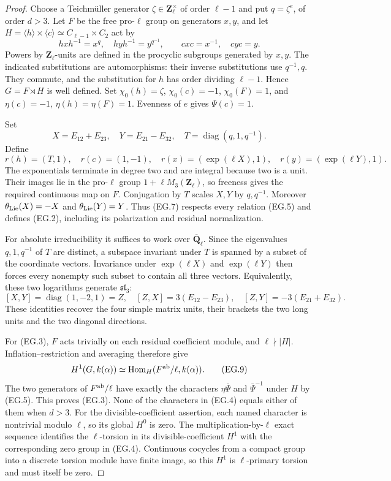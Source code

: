 \documentclass[11pt,a4paper]{article}
\theoremstyle{definition}
\begin{document}
\begin{proof}
Choose a Teichm\"uller generator
$\zeta\in\mathbf Z_\ell^\times$ of order $\ell-1$
and put $q=\zeta^e$, of order $d>3$.
Let $F$ be the free pro-$\ell$ group on generators
$x,y$, and let
$H=\langle h\rangle\times\langle c\rangle
\simeq C_{\ell-1}\times C_2$ act by
\[
 hxh^{-1}=x^q,\quad hyh^{-1}=y^{q^{-1}},\qquad
 cxc=x^{-1},\quad cyc=y.                                 \tag{EG.5}
\]
Powers by $\mathbf Z_\ell$-units are defined in the
procyclic subgroups generated by $x,y$.
The indicated substitutions are automorphisms: their
inverse substitutions use $q^{-1},q$.  They commute,
and the substitution for $h$ has order dividing
$\ell-1$.  Hence $G=F\rtimes H$ is well defined.
Set $\chi_0(h)=\zeta$, $\chi_0(c)=-1$,
$\chi_0(F)=1$, and $\eta(c)=-1$, $\eta(h)=\eta(F)=1$.
Evenness of $e$ gives $\Psi(c)=1$.

Set
\[
 X=E_{12}+E_{23},\quad Y=E_{21}-E_{32},\quad
 T=\operatorname{diag}(q,1,q^{-1}).                       \tag{EG.6}
\]
Define
\[
 r(h)=(T,1),\quad r(c)=(1,-1),\quad
 r(x)=(\exp(\ell X),1),\quad
 r(y)=(\exp(\ell Y),1).                                  \tag{EG.7}
\]
The exponentials terminate in degree two and are
integral because two is a unit.  Their images lie in
the pro-$\ell$ group $1+\ell M_3(\mathbf Z_\ell)$,
so freeness gives the required continuous map on $F$.
Conjugation by $T$ scales $X,Y$ by $q,q^{-1}$.
Moreover $\theta_{\rm Lie}(X)=-X$ and
$\theta_{\rm Lie}(Y)=Y$.  Thus (EG.7) respects every
relation (EG.5) and defines (EG.2), including its
polarization and residual normalization.

For absolute irreducibility it suffices to work over
$\overline{\mathbf Q}_\ell$.  Since the eigenvalues
$q,1,q^{-1}$ of $T$ are distinct, a subspace invariant
under $T$ is spanned by a subset of the coordinate
vectors.  Invariance under $\exp(\ell X)$ and
$\exp(\ell Y)$ then forces every nonempty such subset
to contain all three vectors.  Equivalently, these
two logarithms generate $\mathfrak{sl}_3$:
\[
 [X,Y]=\operatorname{diag}(1,-2,1)=Z,\quad
 [Z,X]=3(E_{12}-E_{23}),\quad
 [Z,Y]=-3(E_{21}+E_{32}).                                 \tag{EG.8}
\]
These identities recover the four simple matrix
units, their brackets the two long units and the
two diagonal directions.

For (EG.3), $F$ acts trivially on each residual
coefficient module, and $\ell\nmid|H|$.
Inflation--restriction and averaging therefore give
\[
 H^1(G,k(\alpha))
 \simeq\operatorname{Hom}_H(F^{\rm ab}/\ell,
                                      k(\alpha)).          \tag{EG.9}
\]
The two generators of $F^{\rm ab}/\ell$ have exactly
the characters $\eta\bar\Psi$ and
$\bar\Psi^{-1}$ under $H$ by (EG.5).
This proves (EG.3).  None of the characters in
(EG.4) equals either of them when $d>3$.
For the divisible-coefficient assertion, each named
character is nontrivial modulo $\ell$, so its global
$H^0$ is zero.  The multiplication-by-$\ell$ exact
sequence identifies the $\ell$-torsion in its
divisible-coefficient $H^1$ with the corresponding
zero group in (EG.4).  Continuous cocycles from a
compact group into a discrete torsion module have
finite image, so this $H^1$ is $\ell$-primary torsion
and must itself be zero.


\end{proof}
\end{document}
